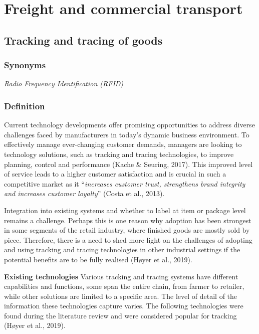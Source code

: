 \documentclass[
]{book}
\begin{document}
\hypertarget{freight}{%
\chapter{Freight and commercial transport}\label{freight}}

\hypertarget{dangerous_goods}{%
\section{Tracking and tracing of goods}\label{dangerous_goods}}

\hypertarget{synonyms-25}{%
\subsection*{Synonyms}\label{synonyms-25}}

\emph{Radio Frequency Identification (RFID)}

\hypertarget{definition-28}{%
\subsection*{Definition}\label{definition-28}}

Current technology developments offer promising opportunities to address diverse challenges faced by manufacturers in today's dynamic business environment. To effectively manage ever-changing customer demands, managers are looking to technology solutions, such as tracking and tracing technologies, to improve planning, control and performance (Kache \& Seuring, 2017). This improved level of service leads to a higher customer satisfaction and is crucial in such a competitive market as it ``\emph{increases customer trust, strengthens brand integrity and increases customer loyalty}'' (Costa et al., 2013).

Integration into existing systems and whether to label at item or package level remains a challenge. Perhaps this is one reason why adoption has been strongest in some segments of the retail industry, where finished goods are mostly sold by piece. Therefore, there is a need to shed more light on the challenges of adopting and using tracking and tracing technologies in other industrial settings if the potential benefits are to be fully realised (Høyer et al., 2019).

\textbf{Existing technologies}
Various tracking and tracing systems have different capabilities and functions, some span the entire chain, from farmer to retailer, while other solutions are limited to a specific area. The level of detail of the information these technologies capture varies. The following technologies were found during the literature review and were considered popular for tracking (Høyer et al., 2019).
\end{document}
